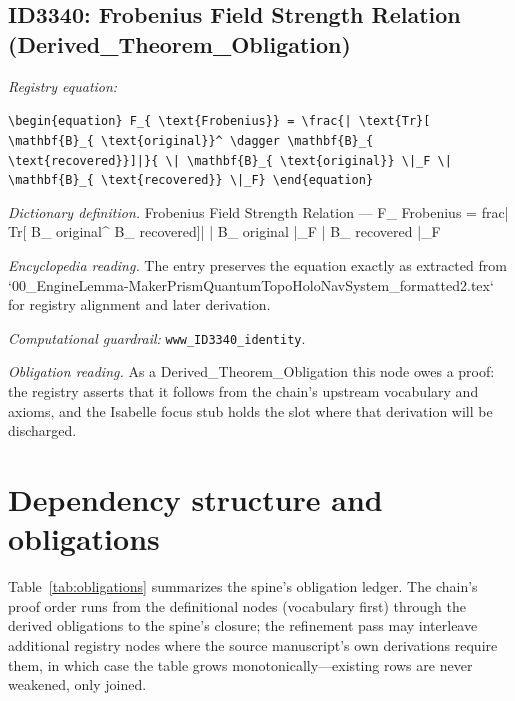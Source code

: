 \documentclass[11pt]{article}
\theoremstyle{remark}
\begin{document}
\subsection{ID3340: Frobenius Field Strength Relation (Derived\_Theorem\_Obligation)}

\noindent\textit{Registry equation:}\par
{\small\texttt{\textbackslash{}begin\{equation\} F\_\{ \textbackslash{}text\{Frobenius\}\} = \textbackslash{}frac\{| \textbackslash{}text\{Tr\}[ \textbackslash{}mathbf\{B\}\_\{ \textbackslash{}text\{original\}\}\textasciicircum{} \textbackslash{}dagger \textbackslash{}mathbf\{B\}\_\{ \textbackslash{}text\{recovered\}\}]|\}\{ \textbackslash{}| \textbackslash{}mathbf\{B\}\_\{ \textbackslash{}text\{original\}\} \textbackslash{}|\_F \textbackslash{}| \textbackslash{}mathbf\{B\}\_\{ \textbackslash{}text\{recovered\}\} \textbackslash{}|\_F\} \textbackslash{}end\{equation\}}}\par\medskip
\noindent\textit{Dictionary definition.} Frobenius Field Strength Relation --- F\_ Frobenius = frac| Tr[ B\_ original\textasciicircum{}  B\_ recovered]| | B\_ original |\_F | B\_ recovered |\_F\par\medskip
\noindent\textit{Encyclopedia reading.} The entry preserves the equation exactly as extracted from `00\_EngineLemma-MakerPrismQuantumTopoHoloNavSystem\_formatted2.tex` for registry alignment and later derivation.
\par\medskip\noindent\textit{Computational guardrail:} \texttt{www\_ID3340\_identity}.
\par\medskip\noindent\textit{Obligation reading.} As a Derived\_Theorem\_Obligation this node owes a proof: the registry asserts that it follows from the chain's upstream vocabulary and axioms, and the Isabelle focus stub holds the slot where that derivation will be discharged.

\section{Dependency structure and obligations}
\label{sec:dep}

Table~\ref{tab:obligations} summarizes the spine's obligation ledger. The chain's proof order runs from the definitional nodes (vocabulary first) through the derived obligations to the spine's closure; the refinement pass may interleave additional registry nodes where the source manuscript's own derivations require them, in which case the table grows monotonically---existing rows are never weakened, only joined.
\end{document}
